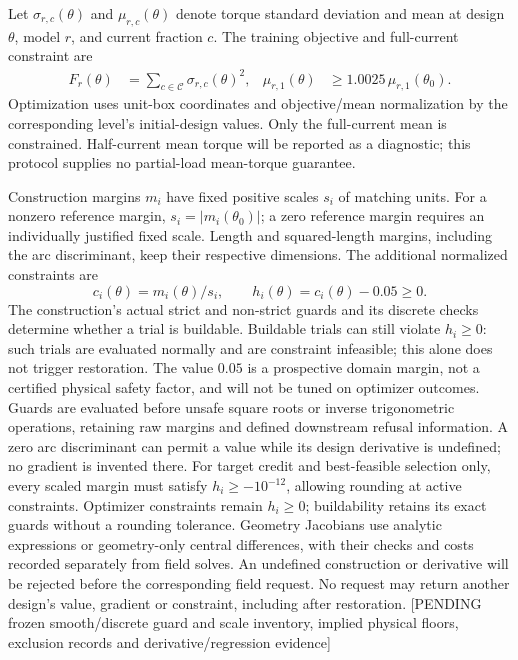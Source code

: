 Let $\sigma_{r,c}(\theta)$ and $\mu_{r,c}(\theta)$ denote torque standard
deviation and mean at design $\theta$, model $r$, and current fraction $c$.
The training objective and full-current constraint are
\begin{align}
 F_r(\theta) &= \sum_{c\in\mathcal C}\sigma_{r,c}(\theta)^2,
 & \mu_{r,1}(\theta)&\geq 1.0025\,\mu_{r,1}(\theta_0).
\end{align}
Optimization uses unit-box coordinates and objective/mean normalization by
the corresponding level's initial-design values. Only the full-current mean
is constrained. Half-current mean torque will be reported as a diagnostic;
this protocol supplies no partial-load mean-torque guarantee.

Construction margins $m_i$ have fixed positive scales $s_i$ of matching units.
For a nonzero reference margin, $s_i=|m_i(\theta_0)|$; a zero reference margin
requires an individually justified fixed scale. Length and squared-length
margins, including the arc discriminant, keep their respective dimensions.
The additional normalized constraints are
\begin{equation}
 c_i(\theta)=m_i(\theta)/s_i,\qquad
 h_i(\theta)=c_i(\theta)-0.05\geq0.
\end{equation}
The construction's actual strict and non-strict guards and its discrete
checks determine whether a trial is buildable. Buildable trials can still
violate $h_i\geq0$: such trials are evaluated normally and are constraint
infeasible; this alone does not trigger restoration. The value $0.05$ is a
prospective domain margin, not a certified physical safety factor, and will
not be tuned on optimizer outcomes. Guards are evaluated before unsafe square
roots or inverse trigonometric operations, retaining raw margins and defined
downstream refusal information. A zero arc discriminant can permit a value
while its design derivative is undefined; no gradient is invented there.
For target credit and best-feasible selection only, every scaled margin must
satisfy $h_i\geq-10^{-12}$, allowing rounding at active constraints.
Optimizer constraints remain $h_i\geq0$; buildability retains its exact guards
without a rounding tolerance.
Geometry Jacobians use analytic expressions or geometry-only central
differences, with their checks and costs recorded separately from field solves.
An undefined construction or derivative will be rejected before the
corresponding field request. No request may return another design's value,
gradient or constraint, including after restoration.
[PENDING frozen smooth/discrete guard and scale inventory, implied physical
floors, exclusion records and derivative/regression evidence]

